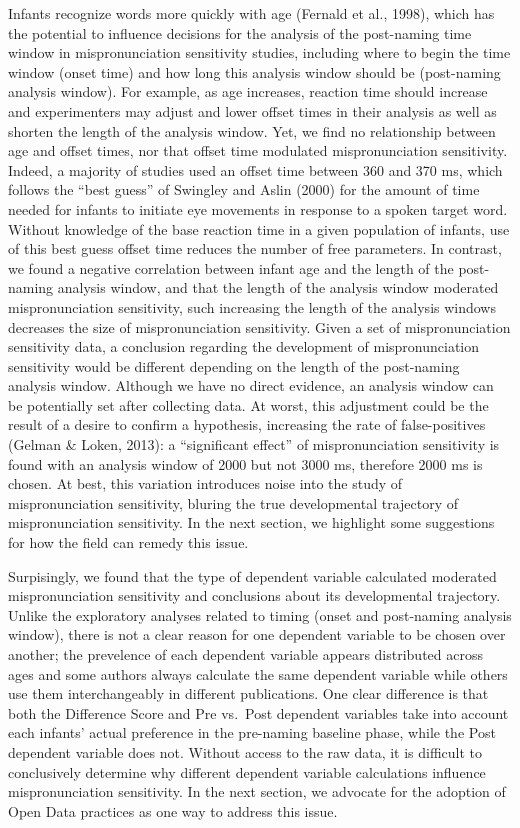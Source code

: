 \documentclass[man]{apa6}
\theoremstyle{definition}
\theoremstyle{definition}
\theoremstyle{definition}
\theoremstyle{remark}
\begin{document}
Infants recognize words more quickly with age (Fernald et al., 1998),
which has the potential to influence decisions for the analysis of the
post-naming time window in mispronunciation sensitivity studies,
including where to begin the time window (onset time) and how long this
analysis window should be (post-naming analysis window). For example, as
age increases, reaction time should increase and experimenters may
adjust and lower offset times in their analysis as well as shorten the
length of the analysis window. Yet, we find no relationship between age
and offset times, nor that offset time modulated mispronunciation
sensitivity. Indeed, a majority of studies used an offset time between
360 and 370 ms, which follows the \enquote{best guess} of Swingley and
Aslin (2000) for the amount of time needed for infants to initiate eye
movements in response to a spoken target word. Without knowledge of the
base reaction time in a given population of infants, use of this best
guess offset time reduces the number of free parameters. In contrast, we
found a negative correlation between infant age and the length of the
post-naming analysis window, and that the length of the analysis window
moderated mispronunciation sensitivity, such increasing the length of
the analysis windows decreases the size of mispronunciation sensitivity.
Given a set of mispronunciation sensitivity data, a conclusion regarding
the development of mispronunciation sensitivity would be different
depending on the length of the post-naming analysis window. Although we
have no direct evidence, an analysis window can be potentially set after
collecting data. At worst, this adjustment could be the result of a
desire to confirm a hypothesis, increasing the rate of false-positives
(Gelman \& Loken, 2013): a \enquote{significant effect} of
mispronunciation sensitivity is found with an analysis window of 2000
but not 3000 ms, therefore 2000 ms is chosen. At best, this variation
introduces noise into the study of mispronunciation sensitivity, bluring
the true developmental trajectory of mispronunciation sensitivity. In
the next section, we highlight some suggestions for how the field can
remedy this issue.

Surpisingly, we found that the type of dependent variable calculated
moderated mispronunciation sensitivity and conclusions about its
developmental trajectory. Unlike the exploratory analyses related to
timing (onset and post-naming analysis window), there is not a clear
reason for one dependent variable to be chosen over another; the
prevelence of each dependent variable appears distributed across ages
and some authors always calculate the same dependent variable while
others use them interchangeably in different publications. One clear
difference is that both the Difference Score and Pre vs.~Post dependent
variables take into account each infants' actual preference in the
pre-naming baseline phase, while the Post dependent variable does not.
Without access to the raw data, it is difficult to conclusively
determine why different dependent variable calculations influence
mispronunciation sensitivity. In the next section, we advocate for the
adoption of Open Data practices as one way to address this issue.
\end{document}
